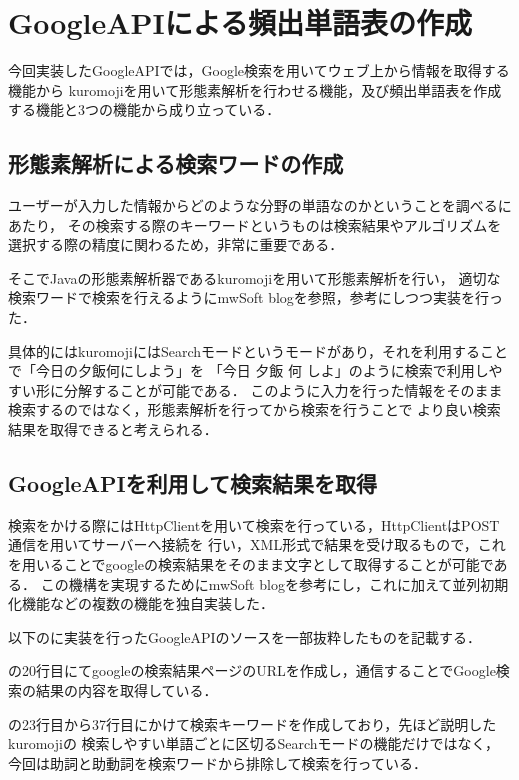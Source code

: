 \section{GoogleAPIによる頻出単語表の作成}
今回実装したGoogleAPIでは，Google検索を用いてウェブ上から情報を取得する機能から
kuromojiを用いて形態素解析を行わせる機能，及び頻出単語表を作成する機能と3つの機能から成り立っている．

\subsection{形態素解析による検索ワードの作成}
ユーザーが入力した情報からどのような分野の単語なのかということを調べるにあたり，
その検索する際のキーワードというものは検索結果やアルゴリズムを選択する際の精度に関わるため，非常に重要である．

そこでJavaの形態素解析器であるkuromoji\cite{gitkuromoji}を用いて形態素解析を行い，
適切な検索ワードで検索を行えるようにmwSoft blog\cite{kuromoji}を参照，参考にしつつ実装を行った．

具体的にはkuromojiにはSearchモードというモードがあり，それを利用することで「今日の夕飯何にしよう」を
「今日 夕飯 何 しよ」のように検索で利用しやすい形に分解することが可能である．
このように入力を行った情報をそのまま検索するのではなく，形態素解析を行ってから検索を行うことで
より良い検索結果を取得できると考えられる．

\subsection{GoogleAPIを利用して検索結果を取得}
検索をかける際にはHttpClientを用いて検索を行っている，HttpClientはPOST通信を用いてサーバーへ接続を
行い，XML形式で結果を受け取るもので，これを用いることでgoogleの検索結果をそのまま文字として取得することが可能である．
この機構を実現するためにmwSoft blog\cite{google}を参考にし，これに加えて並列初期化機能などの複数の機能を独自実装した．

以下のに実装を行ったGoogleAPIのソースを一部抜粋したものを記載する．

の20行目にてgoogleの検索結果ページのURLを作成し，通信することでGoogle検索の結果の内容を取得している．

の23行目から37行目にかけて検索キーワードを作成しており，先ほど説明したkuromojiの
検索しやすい単語ごとに区切るSearchモードの機能だけではなく，今回は助詞と助動詞を検索ワードから排除して検索を行っている．

